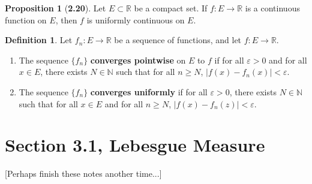 \documentclass[12pt]{article}
\newcommand{\R}{\mathbb{R}}
\newcommand{\N}{\mathbb{N}}
\renewcommand{\epsilon}{\varepsilon}
\theoremstyle{definition}
\newtheorem*{definition}{Definition}
\newtheorem*{prop}{Proposition}
\begin{document}
\begin{prop}[\textbf{2.20}]

    Let \( E \subset \R \) be a compact set. If \( f: E \to \R \) is a continuous function on \( E \), then \( f \) is uniformly continuous on \( E \).
    
\end{prop}

\begin{definition}
    Let \( f_n: E \to \R \) be a sequence of functions, and let \( f: E \to \R \).

        \begin{enumerate}
            \item The sequence \( \{ f_n \} \) \textbf{converges pointwise} on \( E \) to \( f \) if for all \( \epsilon > 0 \) and for all \( x \in E \), there exists \( N \in \N \) such that for all \( n \geq  N\), \( |f(x) - f_n(x)| < \epsilon \).
            \item The sequence \( \{ f_n \} \) \textbf{converges uniformly} if for all \( \epsilon > 0 \), there exists \( N \in \N \) such that for all \( x \in E \) and for all \( n \geq N\), \( |f(x) - f_n(z)| < \epsilon \).
        \end{enumerate}
\end{definition}

\section*{Section 3.1, Lebesgue Measure}


[Perhaps finish these notes another time...]
\end{document}
